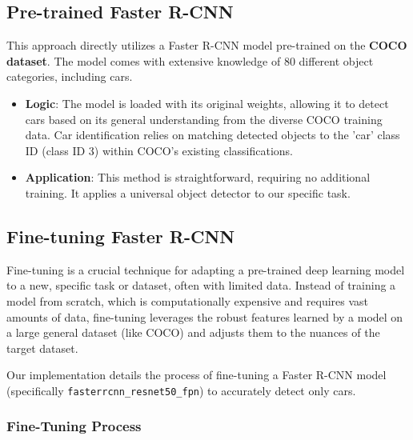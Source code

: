 \documentclass[conference]{IEEEtran}
\begin{document}
\subsection{Pre-trained Faster R-CNN}
\label{ssec:pretrained_fasterrcnn_impl} 
This approach directly utilizes a Faster R-CNN model pre-trained on the \textbf{COCO dataset}. The model comes with extensive knowledge of 80 different object categories, including cars.

\begin{itemize}
    \item \textbf{Logic}: The model is loaded with its original weights, allowing it to detect cars based on its general understanding from the diverse COCO training data. Car identification relies on matching detected objects to the 'car' class ID (class ID 3) within COCO's existing classifications.
    \item \textbf{Application}: This method is straightforward, requiring no additional training. It applies a universal object detector to our specific task.
\end{itemize}

\subsection{Fine-tuning Faster R-CNN}
\label{ssec:fasterrcnn_finetuning_impl} 

Fine-tuning is a crucial technique for adapting a pre-trained deep learning model to a new, specific task or dataset, often with limited data. Instead of training a model from scratch, which is computationally expensive and requires vast amounts of data, fine-tuning leverages the robust features learned by a model on a large general dataset (like COCO) and adjusts them to the nuances of the target dataset.

Our implementation details the process of fine-tuning a Faster R-CNN model (specifically \texttt{fasterrcnn\_resnet50\_fpn}) to accurately detect only cars.

\subsubsection{Fine-Tuning Process}
\end{document}
